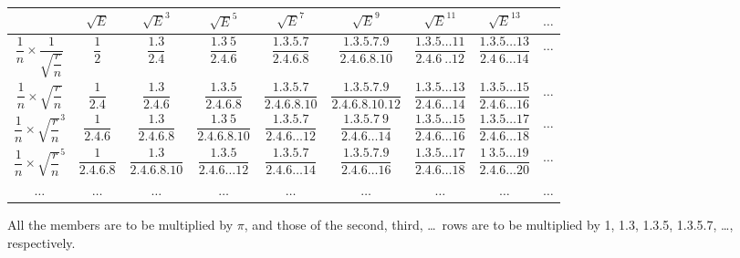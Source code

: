 \documentclass[11pt]{article}
\begin{document}
\begin{center}
\setlength{\tabcolsep}{3pt}
\renewcommand{\arraystretch}{1.6}
\begin{tabular}{|c||c|c|c|c|c|c|c|c|}
\hline
 & $\sqrt{E}$ & $\sqrt{E}^{3}$ & $\sqrt{E}^{5}$ & $\sqrt{E}^{7}$ & $\sqrt{E}^{9}$ & $\sqrt{E}^{11}$ & $\sqrt{E}^{13}$ & $\dots$ \\
\hline\hline
$\dfrac{1}{n}\times\dfrac{1}{\sqrt{\dfrac{r}{n}}}$ & $\dfrac{1}{2}$ & $\dfrac{1.3}{2.4}$ & $\dfrac{1.3\ 5}{2.4.6}$ & $\dfrac{1.3.5.7}{2.4.6.8}$ & $\dfrac{1.3.5.7.9}{2.4.6.8.10}$ & $\dfrac{1.3.5\dots 11}{2.4.6\ ..12}$ & $\dfrac{1.3.5\dots 13}{2.4\ 6\dots 14}$ & $\dots$ \\
\hline
$\dfrac{1}{n}\times\sqrt{\dfrac{r}{n}}$ & $\dfrac{1}{2.4}$ & $\dfrac{1.3}{2.4.6}$ & $\dfrac{1.3.5}{2.4.6.8}$ & $\dfrac{1.3.5.7}{2.4.6.8.10}$ & $\dfrac{1.3.5.7.9}{2.4.6.8.10.12}$ & $\dfrac{1.3.5\dots 13}{2.4.6\dots 14}$ & $\dfrac{1.3.5\dots 15}{2.4.6\dots 16}$ & $\dots$ \\
\hline
$\dfrac{1}{n}\times\sqrt{\dfrac{r}{n}}^{3}$ & $\dfrac{1}{2.4.6}$ & $\dfrac{1.3}{2.4.6.8}$ & $\dfrac{1.3\ 5}{2.4.6.8.10}$ & $\dfrac{1.3.5.7}{2.4.6\dots 12}$ & $\dfrac{1.3.5.7\ 9}{2.4.6\dots 14}$ & $\dfrac{1.3.5\dots 15}{2.4.6\dots 16}$ & $\dfrac{1.3.5\dots 17}{2.4.6\dots 18}$ & $\dots$ \\
\hline
$\dfrac{1}{n}\times\sqrt{\dfrac{r}{n}}^{5}$ & $\dfrac{1}{2.4.6.8}$ & $\dfrac{1.3}{2.4.6.8.10}$ & $\dfrac{1.3.5}{2.4.6\dots 12}$ & $\dfrac{1.3.5.7}{2.4.6\dots 14}$ & $\dfrac{1.3.5.7.9}{2.4.6\dots 16}$ & $\dfrac{1.3.5\dots 17}{2.4.6\dots 18}$ & $\dfrac{1\ 3.5\dots 19}{2.4.6\dots 20}$ & $\dots$ \\
\hline
$\dots$ & $\dots$ & $\dots$ & $\dots$ & $\dots$ & $\dots$ & $\dots$ & $\dots$ & $\dots$ \\
\hline
\end{tabular}
\end{center}

All the members are to be multiplied by $\pi$, and those of the second, third, \dots\ rows are to be multiplied by 1, 1.3, 1.3.5, 1.3.5.7, \dots, respectively.
\end{document}
